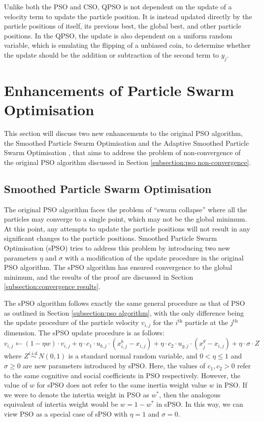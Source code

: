 \documentclass[12pt]{article}
\theoremstyle{definition}
\begin{document}
Unlike both the PSO and CSO, QPSO is not dependent on the update of a velocity term to update the particle position. It is instead updated directly by the particle positions of itself, its previous best, the global best, and other particle positions. In the QPSO, the update is also dependent on a uniform random variable, which is emulating the flipping of a unbiased coin, to determine whether the update should be the addition or subtraction of the second term to $y_j$.

\newpage

\section{Enhancements of Particle Swarm Optimisation}
\label{section:enhancements}
This section will discuss two new enhancements to the original PSO algorithm, the Smoothed Particle Swarm Optimisation and the Adaptive Smoothed Particle Swarm Optimisation \cite{choi2020}, that aims to address the problem of non-convergence of the original PSO algorithm discussed in Section \ref{subsection:pso non-convergence}.

\subsection{Smoothed Particle Swarm Optimisation}
\label{subsection:spso algorithm}
The original PSO algorithm faces the problem of ``swarm collapse'' where all the particles may converge to a single point, which may not be the global minimum. At this point, any attempts to update the particle positions will not result in any significant changes to the particle positions. Smoothed Particle Swarm Optimisation (sPSO) tries to address this problem by introducing two new parameters $\eta$ and $\sigma$ with a modification of the update procedure in the original PSO algorithm. The sPSO algorithm has ensured convergence to the global minimum, and the results of the proof are discussed in Section \ref{subsection:convergence results}. \newline

The sPSO algorithm follows exactly the same general procedure as that of PSO as outlined in Section \ref{subsection:pso algorithm}, with the only difference being the update procedure of the particle velocity $v_{i, j}$ for the $i^\text{th}$ particle at the $j^\text{th}$ dimension. The sPSO update procedure is as follows:
$$v_{i,j} \leftarrow (1 - \eta w) \cdot v_{i,j} + \eta \cdot c_1 \cdot u_{b,j} \cdot  (x^b_{i,j} - x_{i,j}) + \eta \cdot c_2 \cdot u_{g,j} \cdot (x^g_j - x_{i,j}) + \eta \cdot \sigma \cdot Z$$
where $Z \overset{i.i.d.}{\sim} N(0, 1)$ is a standard normal random variable, and $0 < \eta \leq 1$ and $\sigma \geq 0$ are new parameters introduced by sPSO. Here, the values of $c_1, c_2 > 0$ refer to the same cognitive and social coefficients in PSO respectively. However, the value of $w$ for sPSO does not refer to the same inertia weight value $w$ in PSO. If we were to denote the intertia weight in PSO as $w^*$, then the analogous equivalent of intertia weight would be $w = 1 - w^*$ in sPSO. In this way, we can view PSO as a special case of sPSO with $\eta = 1$ and $\sigma = 0$. \newline
\end{document}
